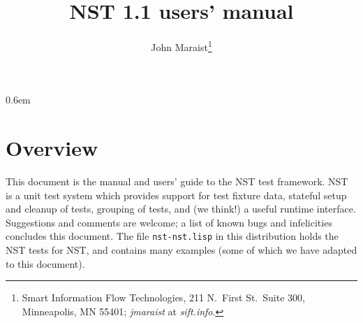 \documentclass[draft]{article}
\title{NST 1.1 users' manual}
\author{John Maraist\thanks{Smart Information Flow Technologies, 211 N.\ First St.\ Suite 300, Minneapolis, MN 55401; \textsl{jmaraist} at \textsl{sift.info}.}}
\begin{document}
\maketitle
\thispagestyle{empty}
\tableofcontents
\parskip 0.6em
\parindent 0pt

\section*{Overview}
This document is the manual and users' guide to the NST test
framework.  NST is a unit test system which provides support for test
fixture data, stateful setup and cleanup of tests, grouping of tests,
and (we think!) a useful runtime interface.  Suggestions and comments
are welcome; a list of known bugs and infelicities concludes this
document.  The file \texttt{nst-nst.lisp} in this distribution holds
the NST tests for NST, and contains many examples (some of which we
have adapted to this document).








%
\appendix

\printindex
\end{document}

